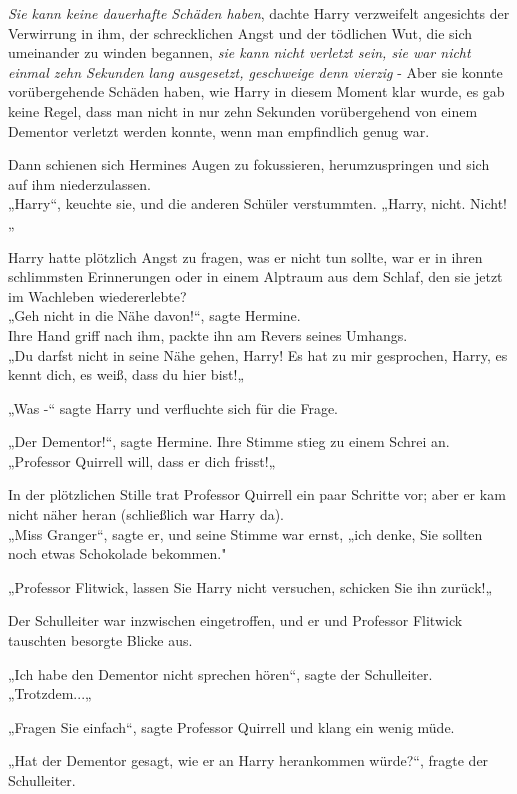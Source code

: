 {\emph{Sie kann keine dauerhafte Schäden haben}, dachte Harry verzweifelt angesichts der Verwirrung in ihm, der schrecklichen Angst und der tödlichen Wut, die sich umeinander zu winden begannen, \emph{sie kann nicht verletzt sein, sie war nicht einmal zehn Sekunden lang ausgesetzt, geschweige denn vierzig} - Aber sie konnte vorübergehende Schäden haben, wie Harry in diesem Moment klar wurde, es gab keine Regel, dass man nicht in nur zehn Sekunden vorübergehend von einem Dementor verletzt werden konnte, wenn man empfindlich genug war.

Dann schienen sich Hermines Augen zu fokussieren, herumzuspringen und sich auf ihm niederzulassen.\\ „Harry“, keuchte sie, und die anderen Schüler verstummten. „Harry, nicht. Nicht!„

Harry hatte plötzlich Angst zu fragen, was er nicht tun sollte, war er in ihren schlimmsten Erinnerungen oder in einem Alptraum aus dem Schlaf, den sie jetzt im Wachleben wiedererlebte?\\ „Geh nicht in die Nähe davon!“, sagte Hermine.\\ Ihre Hand griff nach ihm, packte ihn am Revers seines Umhangs.\\ „Du darfst nicht in seine Nähe gehen, Harry! Es hat zu mir gesprochen, Harry, es kennt dich, es weiß, dass du hier bist!„

„Was -“ sagte Harry und verfluchte sich für die Frage.

„Der Dementor!“, sagte Hermine. Ihre Stimme stieg zu einem Schrei an. „Professor Quirrell will, dass er dich frisst!„

In der plötzlichen Stille trat Professor Quirrell ein paar Schritte vor; aber er kam nicht näher heran (schließlich war Harry da).\\ „Miss Granger“, sagte er, und seine Stimme war ernst, „ich denke, Sie sollten noch etwas Schokolade bekommen."

„Professor Flitwick, lassen Sie Harry nicht versuchen, schicken Sie ihn zurück!„

Der Schulleiter war inzwischen eingetroffen, und er und Professor Flitwick tauschten besorgte Blicke aus.

„Ich habe den Dementor nicht sprechen hören“, sagte der Schulleiter. „Trotzdem...„

„Fragen Sie einfach“, sagte Professor Quirrell und klang ein wenig müde.

„Hat der Dementor gesagt, wie er an Harry herankommen würde?“, fragte der Schulleiter.

}
